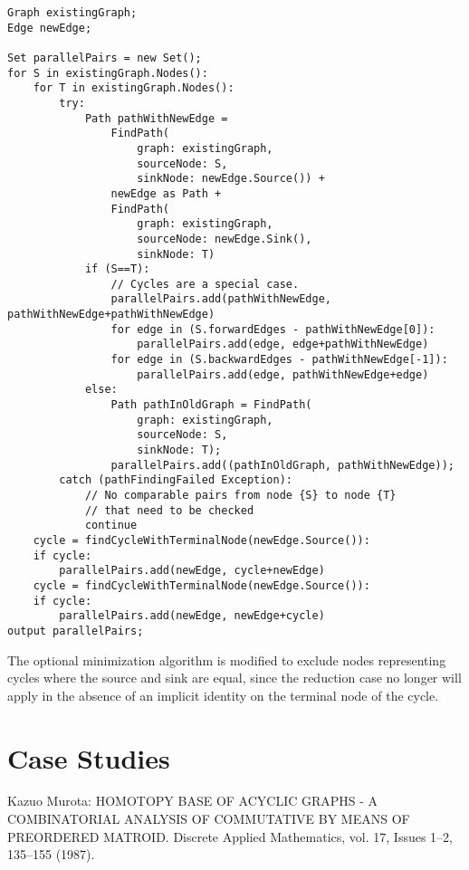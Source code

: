 \documentclass[sigplan,review,anonymous]{acmart}
\begin{document}
\begin{verbatim}
Graph existingGraph;
Edge newEdge;

Set parallelPairs = new Set();
for S in existingGraph.Nodes():
    for T in existingGraph.Nodes():
        try:
            Path pathWithNewEdge = 
                FindPath(
                    graph: existingGraph, 
                    sourceNode: S,
                    sinkNode: newEdge.Source()) +
                newEdge as Path +
                FindPath(
                    graph: existingGraph, 
                    sourceNode: newEdge.Sink(), 
                    sinkNode: T)
            if (S==T):
                // Cycles are a special case.
                parallelPairs.add(pathWithNewEdge, pathWithNewEdge+pathWithNewEdge)
                for edge in (S.forwardEdges - pathWithNewEdge[0]):
                    parallelPairs.add(edge, edge+pathWithNewEdge)
                for edge in (S.backwardEdges - pathWithNewEdge[-1]):
                    parallelPairs.add(edge, pathWithNewEdge+edge)
            else:
                Path pathInOldGraph = FindPath(
                    graph: existingGraph, 
                    sourceNode: S, 
                    sinkNode: T);
                parallelPairs.add((pathInOldGraph, pathWithNewEdge));
        catch (pathFindingFailed Exception):
            // No comparable pairs from node {S} to node {T} 
            // that need to be checked
            continue
    cycle = findCycleWithTerminalNode(newEdge.Source()):
    if cycle:    
        parallelPairs.add(newEdge, cycle+newEdge)
    cycle = findCycleWithTerminalNode(newEdge.Source()):
    if cycle:    
        parallelPairs.add(newEdge, newEdge+cycle)
output parallelPairs;
\end{verbatim}

The optional minimization algorithm is modified to exclude nodes representing cycles where the source and sink are equal, since the reduction case no longer will apply in the absence of an implicit identity on the terminal node of the cycle.

\section{Case Studies}

%
%
%
% 
% 
%
\begin{thebibliography}{8}

Kazuo Murota: {HOMOTOPY BASE OF ACYCLIC GRAPHS - A COMBINATORIAL ANALYSIS OF COMMUTATIVE BY MEANS OF PREORDERED MATROID}. Discrete Applied Mathematics, vol. 17, Issues 1--2, 135--155 (1987).

\end{thebibliography}
\end{document}
